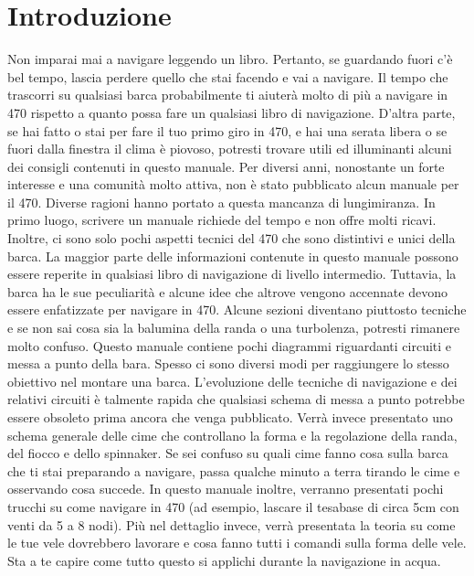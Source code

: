 
\section{Introduzione}
\label{sec:Introduzione}
Non imparai mai a navigare leggendo un libro. Pertanto, se guardando fuori c'è
bel tempo, lascia perdere quello che stai facendo e vai a navigare. Il tempo che
trascorri su qualsiasi barca probabilmente ti aiuterà molto di più a navigare in
470 rispetto a quanto possa fare un qualsiasi libro di
navigazione. D'altra parte, se hai fatto o stai per fare il tuo primo giro in
470, e hai una serata libera o se fuori dalla finestra il clima è piovoso, potresti trovare utili
ed illuminanti alcuni dei consigli contenuti in questo manuale.
Per diversi anni, nonostante un forte interesse e una comunità molto attiva, non
è stato pubblicato alcun manuale per il 470. Diverse ragioni hanno portato a
questa mancanza di lungimiranza. In primo luogo, scrivere un manuale richiede
del tempo e non offre molti ricavi. Inoltre, ci sono solo pochi aspetti tecnici
del 470 che sono distintivi e unici della barca. La maggior parte delle
informazioni contenute in questo manuale possono essere reperite in qualsiasi
libro di navigazione di livello intermedio. Tuttavia, la barca ha le sue
peculiarità e alcune idee che altrove vengono accennate devono essere
enfatizzate per navigare in 470. Alcune sezioni diventano piuttosto tecniche e
se non sai cosa sia la balumina della randa o una turbolenza, potresti rimanere molto
confuso. Questo manuale contiene pochi diagrammi riguardanti circuiti e messa a
punto della bara. Spesso ci sono diversi modi per raggiungere lo stesso
obiettivo nel montare una barca. L'evoluzione delle tecniche di navigazione e
dei relativi circuiti è talmente rapida che
qualsiasi schema di messa a punto potrebbe essere obsoleto prima ancora che
venga pubblicato. Verrà invece presentato uno schema generale delle cime che
controllano la forma e la regolazione della randa, del fiocco e dello spinnaker.
Se sei confuso su quali cime fanno cosa sulla barca che ti stai preparando a
navigare, passa qualche minuto a terra tirando le cime e osservando cosa
succede. In questo manuale inoltre, verranno presentati pochi trucchi su
come navigare in 470 (ad esempio, lascare il tesabase di circa 5cm con venti da 5
a 8 nodi). Più nel dettaglio invece, verrà presentata la teoria su come le tue vele dovrebbero
lavorare e cosa fanno tutti i comandi sulla forma delle vele. Sta a te capire
come tutto questo si applichi durante la navigazione in acqua.

